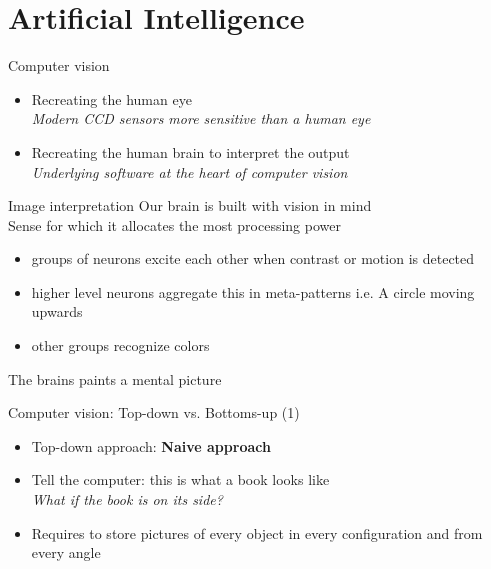 \documentclass{beamer}
\begin{document}
\section{Artificial Intelligence}
\begin{frame}{Computer vision}
	\begin{itemize}
	\item Recreating the human eye \\
        \hspace{0.27cm} \textit{Modern CCD sensors more sensitive than a human eye}
    \item Recreating the human brain to interpret the output \\
        \hspace{0.27cm} \textit{Underlying software at the heart of computer vision}
	\end{itemize}
\end{frame}

\begin{frame}{Image interpretation}
Our brain is built with vision in mind \\
Sense for which it allocates the most processing power \\
\begin{itemize}
\item groups of neurons excite each other when contrast or motion is detected
\item higher level neurons aggregate this in meta-patterns i.e. A circle moving upwards
\item other groups recognize colors
\end{itemize}
The brains paints a mental picture
\end{frame}

\begin{frame}{Computer vision: Top-down vs. Bottoms-up (1)}
    \begin{itemize}
        \item Top-down approach: \textbf{Naive approach} \\
        \item Tell the computer: this is what a book looks like \\
            \hspace{0.27cm} \textit{What if the book is on its side?} \\
        \item Requires to store pictures of every object in every configuration and from every angle
    \end{itemize}
\end{frame}
\end{document}

